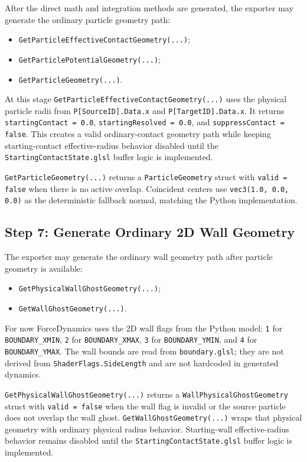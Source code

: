 After the direct math and integration methods are generated, the exporter may
generate the ordinary particle geometry path:
\begin{itemize}
    \item \texttt{GetParticleEffectiveContactGeometry(...)};
    \item \texttt{GetParticlePotentialGeometry(...)};
    \item \texttt{GetParticleGeometry(...)}.
\end{itemize}

At this stage \texttt{GetParticleEffectiveContactGeometry(...)} uses the
physical particle radii from \texttt{P[SourceID].Data.x} and
\texttt{P[TargetID].Data.x}.  It returns \texttt{startingContact = 0.0},
\texttt{startingResolved = 0.0}, and \texttt{suppressContact = false}.  This
creates a valid ordinary-contact geometry path while keeping starting-contact
effective-radius behavior disabled until the
\texttt{StartingContactState.glsl} buffer logic is implemented.

\texttt{GetParticleGeometry(...)} returns a \texttt{ParticleGeometry} struct
with \texttt{valid = false} when there is no active overlap.  Coincident
centers use \texttt{vec3(1.0, 0.0, 0.0)} as the deterministic fallback normal,
matching the Python implementation.

\subsection{Step 7: Generate Ordinary 2D Wall Geometry}

The exporter may generate the ordinary wall geometry path after particle
geometry is available:
\begin{itemize}
    \item \texttt{GetPhysicalWallGhostGeometry(...)};
    \item \texttt{GetWallGhostGeometry(...)}.
\end{itemize}

For now ForceDynamics uses the 2D wall flags from the Python model:
\texttt{1} for \texttt{BOUNDARY\_XMIN}, \texttt{2} for
\texttt{BOUNDARY\_XMAX}, \texttt{3} for \texttt{BOUNDARY\_YMIN}, and
\texttt{4} for \texttt{BOUNDARY\_YMAX}.  The wall bounds are read from
\texttt{boundary.glsl}; they are not derived from
\texttt{ShaderFlags.SideLength} and are not hardcoded in generated dynamics.

\texttt{GetPhysicalWallGhostGeometry(...)} returns a
\texttt{WallPhysicalGhostGeometry} struct with \texttt{valid = false} when the
wall flag is invalid or the source particle does not overlap the wall ghost.
\texttt{GetWallGhostGeometry(...)} wraps that physical geometry with ordinary
physical radius behavior.  Starting-wall effective-radius behavior remains
disabled until the \texttt{StartingContactState.glsl} buffer logic is
implemented.


